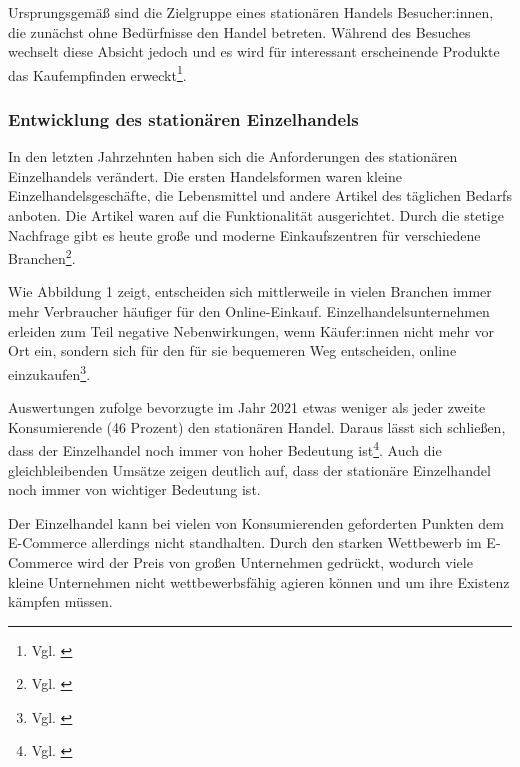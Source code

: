 Ursprungsgemäß sind die Zielgruppe eines stationären Handels Besucher:innen, die zunächst ohne Bedürfnisse den Handel betreten. Während des Besuches wechselt diese Absicht jedoch und es wird für interessant erscheinende Produkte das Kaufempfinden erweckt\footnote{Vgl. \autocite [S.53] {Heinemann2021}}.


\subsubsection{Entwicklung des stationären Einzelhandels}\label{unterabschnitt_2_3_1}
In den letzten Jahrzehnten haben sich die Anforderungen des stationären Einzelhandels verändert. Die ersten Handelsformen waren kleine Einzelhandelsgeschäfte, die Lebensmittel und andere Artikel des täglichen Bedarfs anboten. Die Artikel waren auf die Funktionalität ausgerichtet. Durch die stetige Nachfrage gibt es heute große und moderne Einkaufszentren für verschiedene Branchen\footnote{Vgl. \autocite [S.3] {Jaeger2016}}.
\newline

Wie Abbildung 1 zeigt, entscheiden sich mittlerweile in vielen Branchen immer mehr Verbraucher häufiger für den Online-Einkauf. Einzelhandelsunternehmen erleiden zum Teil negative Nebenwirkungen, wenn Käufer:innen nicht mehr vor Ort ein, sondern sich für den für sie bequemeren Weg entscheiden, online einzukaufen\footnote{Vgl. \autocite [S.11] {Deichner2022}}.
\newline

Auswertungen zufolge bevorzugte im Jahr 2021 etwas weniger als jeder zweite Konsumierende (46 Prozent) den stationären Handel. Daraus lässt sich schließen, dass der Einzelhandel noch immer von hoher Bedeutung ist\footnote{Vgl. \autocite [Online] {Bundesamt2022}}. Auch die gleichbleibenden Umsätze zeigen deutlich auf, dass der stationäre Einzelhandel noch immer von wichtiger Bedeutung ist.
\newline

Der Einzelhandel kann bei vielen von Konsumierenden geforderten Punkten dem E-Commerce allerdings nicht standhalten. Durch den starken Wettbewerb im E-Commerce wird der Preis von großen Unternehmen gedrückt, wodurch viele kleine Unternehmen nicht wettbewerbsfähig agieren können und um ihre Existenz kämpfen müssen.
\newline

